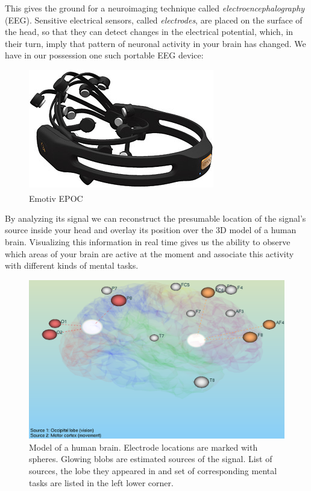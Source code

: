 \documentclass[twocolumn]{article}
\begin{document}
This gives the ground for a neuroimaging technique called \emph{electroencephalography} (EEG). Sensitive electrical sensors, called \emph{electrodes}, are placed on the surface of the head, so that they can detect changes in the electrical potential, which, in their turn, imply that pattern of neuronal activity in your brain has changed.
We have in our possession one such portable EEG device:
\begin{figure}[H]
    \centering
    \includegraphics[width=0.56\linewidth]{../Images/emotiv.jpg} 
    \caption{Emotiv EPOC\textsuperscript{\textregistered}}
    \label{fig:emotiv_epoc}
\end{figure}
By analyzing its signal we can reconstruct the presumable location of the signal's source inside your head and overlay its position over the 3D model of a human brain. Visualizing this information in real time gives us the ability to observe which areas of your brain are active at the moment and associate this activity with different kinds of mental tasks.
\begin{figure}[H]
   \centering
   \includegraphics[width=1\linewidth]{../Images/screenshot.png} 
   \caption{Model of a human brain\cite{brainder}. Electrode locations are marked with spheres. Glowing blobs are estimated sources of the signal. List of sources, the lobe they appeared in and set of corresponding mental tasks are listed in the left lower corner.}
   \label{fig:screenshow}
\end{figure}
\end{document}
